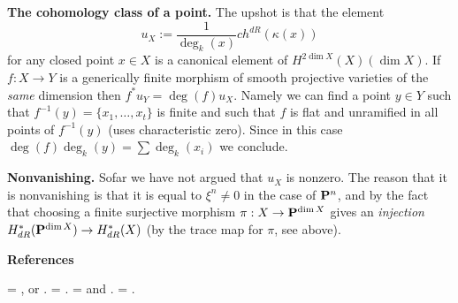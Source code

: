 \medskip\noindent
{\bf The cohomology class of a point.}
The upshot is that the element
$$
u_X := \frac{ 1 }{ \deg_k(x) } ch^{dR}( \kappa(x) )
$$
for any closed point $x \in X$ is a canonical element
of $H^{2\dim X}(X)(\dim X)$. If $f : X \to Y$ is a
generically finite morphism of smooth
projective varieties of the {\it same} dimension
then $f^* u_Y = \deg(f) u_X$. Namely we can find a 
point $y \in Y$ such that $f^{-1}(y) = \{x_1,\ldots,x_t\}$
is finite and such that $f$ is flat and unramified in all points
of $f^{-1}(y)$ (uses characteristic zero).
Since in this case $\deg(f) \deg_k(y) = \sum \deg_k(x_i)$
we conclude.

\medskip\noindent
{\bf Nonvanishing.}
Sofar we have not argued that $u_X$ is nonzero. 
The reason that it is nonvanishing is that it is 
equal to $\xi^n \not=0$ in the case of ${\bf P}^n$,
and by the fact that choosing a finite surjective
morphism $\pi : X \to {\bf P}^{\dim X}$ gives
an {\it injection} $H^*_{dR}({\bf P}^{\dim X})
\to H^*_{dR}(X)$ (by the trace map for $\pi$, see above).



















\medskip\noindent
{\bf References}

\medskip\noindent
[Serre] = \cite{Serre_local_algebra}, or \cite{Serre_algebre_locale}.
\hfill\break
[Samuel] = \cite{Samuel}.
\hfill\break
[Chevalley] =  \cite{ChevalleyI} and \cite{ChevalleyII}.
\hfill\break
[Fulton] = \cite{F}.







